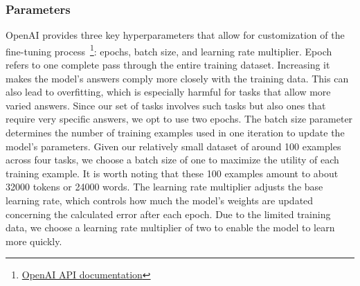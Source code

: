 \subsubsection{Parameters}
OpenAI provides three key hyperparameters that allow for customization of the fine-tuning process~\footnote{\href{https://platform.openai.com/docs/api-reference/fine-tuning/create\#fine-tuning-create-hyperparameters}{OpenAI API documentation}}: epochs, batch size, and learning rate multiplier. Epoch refers to one complete pass through the entire training dataset. Increasing it makes the model's answers comply more closely with the training data. This can also lead to overfitting, which is especially harmful for tasks that allow more varied answers. Since our set of tasks involves such tasks but also ones that require very specific answers, we opt to use two epochs. The batch size parameter determines the number of training examples used in one iteration to update the model’s parameters. Given our relatively small dataset of around 100 examples across four tasks, we choose a batch size of one to maximize the utility of each training example. It is worth noting that these 100 examples amount to about 32000 tokens or 24000 words. The learning rate multiplier adjusts the base learning rate, which controls how much the model’s weights are updated concerning the calculated error after each epoch. Due to the limited training data, we choose a learning rate multiplier of two to enable the model to learn more quickly. 

